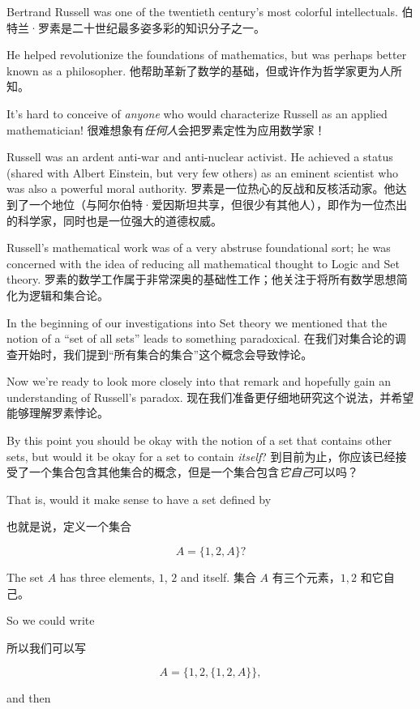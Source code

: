 Bertrand Russell was one of the twentieth century's most colorful
intellectuals.
伯特兰·罗素是二十世纪最多姿多彩的知识分子之一。

He helped revolutionize the foundations of mathematics,
but was perhaps better known as a philosopher.
他帮助革新了数学的基础，但或许作为哲学家更为人所知。

It's hard to conceive 
of \emph{anyone} who would characterize Russell as an applied mathematician!
很难想象有\emph{任何人}会把罗素定性为应用数学家！

Russell was an ardent anti-war and anti-nuclear activist.  He achieved a
status (shared with Albert Einstein, but very few others) as an eminent
scientist who was also a powerful moral authority.
罗素是一位热心的反战和反核活动家。他达到了一个地位（与阿尔伯特·爱因斯坦共享，但很少有其他人），即作为一位杰出的科学家，同时也是一位强大的道德权威。

Russell's mathematical
work was of a very abstruse foundational sort; he was concerned with
the idea of reducing all mathematical thought to Logic and Set theory.
罗素的数学工作属于非常深奥的基础性工作；他关注于将所有数学思想简化为逻辑和集合论。

In the beginning of our investigations into Set theory we mentioned 
that the notion of a ``set of all sets'' leads to something paradoxical.
在我们对集合论的调查开始时，我们提到“所有集合的集合”这个概念会导致悖论。

Now we're ready to look more closely into that remark and hopefully 
gain an understanding of Russell's paradox.
现在我们准备更仔细地研究这个说法，并希望能够理解罗素悖论。

By this point you should be okay with the notion of a set that 
contains other sets, but would it be okay for a set to contain
\emph{itself}?
到目前为止，你应该已经接受了一个集合包含其他集合的概念，但是一个集合包含\emph{它自己}可以吗？

That is, would it make sense to have a set 
defined by

也就是说，定义一个集合

\[ A = \{ 1, 2, A \}?
\]

\noindent The set $A$ has three elements, $1$, $2$ and itself.
\noindent 集合 $A$ 有三个元素，$1, 2$ 和它自己。

So we
could write

所以我们可以写

\[ A = \{ 1, 2, \{ 1, 2, A \} \}, \]
 
\noindent and then

